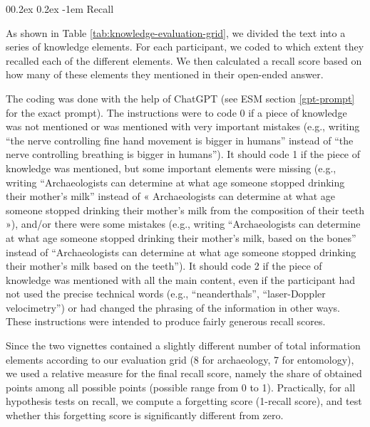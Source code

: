 \documentclass[
  doc,floatsintext]{apa6}
\makeatletter
\let\oldparagraph\paragraph
\renewcommand{\paragraph}{
    \@ifstar
      \xxxParagraphStar
      \xxxParagraphNoStar
  }
\newcommand{\xxxParagraphStar}[1]{\oldparagraph*{#1}\mbox{}}
\newcommand{\xxxParagraphNoStar}[1]{\oldparagraph{#1}\mbox{}}
\renewcommand{\paragraph}{\@startsection{paragraph}{4}{\parindent}%
  {0\baselineskip \@plus 0.2ex \@minus 0.2ex}%
  {-1em}%
  {\normalfont\normalsize\bfseries\itshape\typesectitle}}
\makeatother
\begin{document}
\paragraph{Recall}\label{recall}

As shown in Table \ref{tab:knowledge-evaluation-grid}, we divided the text into a series of knowledge elements. For each participant, we coded to which extent they recalled each of the different elements. We then calculated a recall score based on how many of these elements they mentioned in their open-ended answer.

The coding was done with the help of ChatGPT (see ESM section \ref{gpt-prompt} for the exact prompt). The instructions were to code 0 if a piece of knowledge was not mentioned or was mentioned with very important mistakes (e.g., writing ``the nerve controlling fine hand movement is bigger in humans'' instead of ``the nerve controlling breathing is bigger in humans''). It should code 1 if the piece of knowledge was mentioned, but some important elements were missing (e.g., writing ``Archaeologists can determine at what age someone stopped drinking their mother's milk'' instead of « Archaeologists can determine at what age someone stopped drinking their mother's milk from the composition of their teeth »), and/or there were some mistakes (e.g., writing ``Archaeologists can determine at what age someone stopped drinking their mother's milk, based on the bones'' instead of ``Archaeologists can determine at what age someone stopped drinking their mother's milk based on the teeth''). It should code 2 if the piece of knowledge was mentioned with all the main content, even if the participant had not used the precise technical words (e.g., ``neanderthals'', ``laser-Doppler velocimetry'') or had changed the phrasing of the information in other ways. These instructions were intended to produce fairly generous recall scores.

Since the two vignettes contained a slightly different number of total information elements according to our evaluation grid (8 for archaeology, 7 for entomology), we used a relative measure for the final recall score, namely the share of obtained points among all possible points (possible range from 0 to 1). Practically, for all hypothesis tests on recall, we compute a forgetting score (1-recall score), and test whether this forgetting score is significantly different from zero.
\end{document}
